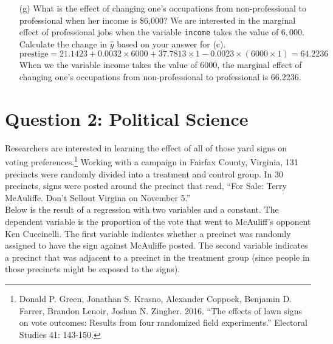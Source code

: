 \documentclass[12pt,letterpaper]{article}
\begin{document}
\begin{enumerate}
	
	\vspace{.25cm}
	\item [(g)]
	What is the effect of changing one's occupations from non-professional to professional when her income is \$6,000? We are interested in the marginal effect of professional jobs when the variable \texttt{income} takes the value of $6,000$. Calculate the change in $\hat{y}$ based on your answer for (c).\vspace{.25cm}
	\[
	\text{{prestige}} = 21.1423 + 0.0032 \times 6000 + 37.7813 \times 1 - 0.0023 \times (6000 \times 1) = 64.2236
	\]
	When we the variable income takes the value of 6000, the marginal effect of changing one's occupations from non-professional to professional is 66.2236.
	
	
	
\end{enumerate}

\newpage

\section*{Question 2: Political Science}
\vspace{.25cm}
\noindent 	Researchers are interested in learning the effect of all of those yard signs on voting preferences.\footnote{Donald P. Green, Jonathan	S. Krasno, Alexander Coppock, Benjamin D. Farrer,	Brandon Lenoir, Joshua N. Zingher. 2016. ``The effects of lawn signs on vote outcomes: Results from four randomized field experiments.'' Electoral Studies 41: 143-150. } Working with a campaign in Fairfax County, Virginia, 131 precincts were randomly divided into a treatment and control group. In 30 precincts, signs were posted around the precinct that read, ``For Sale: Terry McAuliffe. Don't Sellout Virgina on November 5.'' \\

Below is the result of a regression with two variables and a constant.  The dependent variable is the proportion of the vote that went to McAuliff's opponent Ken Cuccinelli. The first variable indicates whether a precinct was randomly assigned to have the sign against McAuliffe posted. The second variable indicates
a precinct that was adjacent to a precinct in the treatment group (since people in those precincts might be exposed to the signs).  \\
\end{document}
